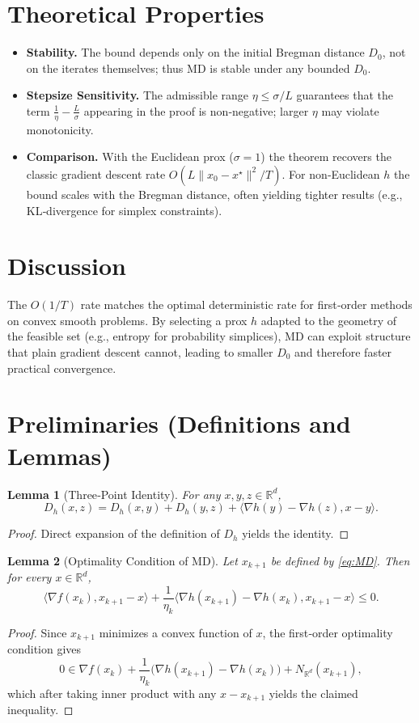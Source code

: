 \documentclass{article}
\newtheorem{lemma}{Lemma}
\newcommand{\inner}[2]{\langle #1,#2\rangle}
\newcommand{\grad}{\nabla}
\newcommand{\Breg}[2]{D_h(#1,#2)}
\newcommand{\R}{\mathbb{R}}
\begin{document}
\section*{Theoretical Properties}
\begin{itemize}[leftmargin=*]
\item \textbf{Stability.} The bound depends only on the initial Bregman distance $D_{0}$, not on the iterates themselves; thus MD is stable under any bounded $D_{0}$.
\item \textbf{Stepsize Sensitivity.} The admissible range $\eta\le\sigma/L$ guarantees that the term $\frac{1}{\eta}-\frac{L}{\sigma}$ appearing in the proof is non‑negative; larger $\eta$ may violate monotonicity.
\item \textbf{Comparison.} With the Euclidean prox ($\sigma=1$) the theorem recovers the classic gradient descent rate $O(L\|x_0-x^{\star}\|^{2}/T)$. For non‑Euclidean $h$ the bound scales with the Bregman distance, often yielding tighter results (e.g., KL‑divergence for simplex constraints).
\end{itemize}

\section*{Discussion}
The $O(1/T)$ rate matches the optimal deterministic rate for first‑order methods on convex smooth problems. By selecting a prox $h$ adapted to the geometry of the feasible set (e.g., entropy for probability simplices), MD can exploit structure that plain gradient descent cannot, leading to smaller $D_{0}$ and therefore faster practical convergence.

\section*{Preliminaries (Definitions and Lemmas)}
\begin{lemma}[Three‑Point Identity]\label{lem:3pt}
For any $x,y,z\in\R^d$,
\[
\Breg{x}{z}= \Breg{x}{y}+ \Breg{y}{z}+ \inner{\grad h(y)-\grad h(z)}{x-y}.
\]
\end{lemma}
\begin{proof}
Direct expansion of the definition of $D_h$ yields the identity. \hfill\qedsymbol
\end{proof}

\begin{lemma}[Optimality Condition of MD]\label{lem:optcond}
Let $x_{k+1}$ be defined by \eqref{eq:MD}. Then for every $x\in\R^d$,
\[
\inner{\grad f(x_k)}{x_{k+1}-x}+ \frac{1}{\eta_k}\inner{\grad h(x_{k+1})-\grad h(x_k)}{x_{k+1}-x}\le 0 .
\]
\end{lemma}
\begin{proof}
Since $x_{k+1}$ minimizes a convex function of $x$, the first‑order optimality condition gives
\[
0\in \grad f(x_k)+\frac{1}{\eta_k}\big(\grad h(x_{k+1})-\grad h(x_k)\big)+N_{\R^d}(x_{k+1}),
\]
which after taking inner product with any $x-x_{k+1}$ yields the claimed inequality. \hfill\qedsymbol
\end{proof}
\end{document}
